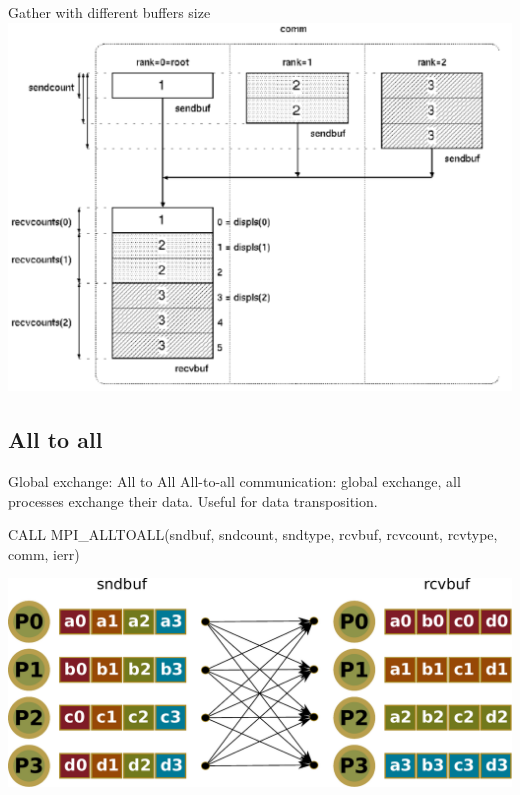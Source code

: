\documentclass[aspectratio=43]{beamer}
\begin{document}
\begin{frame}{Gather with different buffers size}
\includegraphics[scale=0.5]{03.MPI_Coll/gather2.pdf}
\end{frame}

\subsection{All to all}
\begin{frame}[fragile]{Global exchange: All to All}
All-to-all communication: global exchange, all processes exchange their data. Useful for data transposition.\\
\begin{Fortranlisting}[]{}
CALL MPI_ALLTOALL(sndbuf, sndcount, sndtype,
                  rcvbuf, rcvcount, rcvtype, comm, ierr)
\end{Fortranlisting}
\begin{center}
\includegraphics[scale=0.5]{03.MPI_Coll/alltoall.pdf}
\end{center}
\end{frame}
\end{document}
